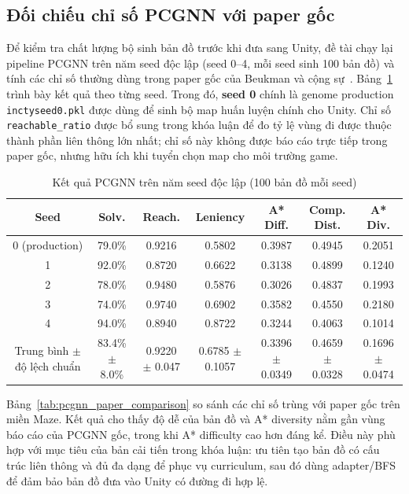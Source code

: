 \subsection{Đối chiếu chỉ số PCGNN với paper gốc}

Để kiểm tra chất lượng bộ sinh bản đồ trước khi đưa sang Unity, đề tài chạy lại pipeline PCGNN trên năm seed độc lập (seed 0--4, mỗi seed sinh 100 bản đồ) và tính các chỉ số thường dùng trong paper gốc của Beukman và cộng sự~\cite{Beukman2022}. Bảng~\ref{tab:pcgnn_four_seed_metrics} trình bày kết quả theo từng seed. Trong đó, \textbf{seed 0} chính là genome production \texttt{inctyseed0.pkl} được dùng để sinh bộ map huấn luyện chính cho Unity. Chỉ số \texttt{reachable\_ratio} được bổ sung trong khóa luận để đo tỷ lệ vùng đi được thuộc thành phần liên thông lớn nhất; chỉ số này không được báo cáo trực tiếp trong paper gốc, nhưng hữu ích khi tuyển chọn map cho môi trường game.

\begin{table}[H]
    \centering
    \scriptsize
    \setlength{\tabcolsep}{4pt}
    \renewcommand{\arraystretch}{1.15}
    \caption{Kết quả PCGNN trên năm seed độc lập (100 bản đồ mỗi seed)}
    \label{tab:pcgnn_four_seed_metrics}
    \begin{tabular}{c c c c c c c}
        \toprule
        \textbf{Seed} & \textbf{Solv.} & \textbf{Reach.} & \textbf{Leniency} & \textbf{A* Diff.} & \textbf{Comp. Dist.} & \textbf{A* Div.} \\
        \midrule
        0 (production) & 79.0\% & 0.9216 & 0.5802 & 0.3987 & 0.4945 & 0.2051 \\
        1 & 92.0\% & 0.8720 & 0.6622 & 0.3138 & 0.4899 & 0.1240 \\
        2 & 78.0\% & 0.9480 & 0.5876 & 0.3026 & 0.4837 & 0.1993 \\
        3 & 74.0\% & 0.9740 & 0.6902 & 0.3582 & 0.4550 & 0.2180 \\
        4 & 94.0\% & 0.8940 & 0.8722 & 0.3244 & 0.4063 & 0.1014 \\
        \midrule
        Trung bình $\pm$ độ lệch chuẩn & 83.4\% $\pm$ 8.0\% & 0.9220 $\pm$ 0.047 & 0.6785 $\pm$ 0.1057 & 0.3396 $\pm$ 0.0349 & 0.4659 $\pm$ 0.0328 & 0.1696 $\pm$ 0.0474 \\
        \bottomrule
    \end{tabular}
\end{table}

Bảng~\ref{tab:pcgnn_paper_comparison} so sánh các chỉ số trùng với paper gốc trên miền Maze. Kết quả cho thấy độ dễ của bản đồ và A* diversity nằm gần vùng báo cáo của PCGNN gốc, trong khi A* difficulty cao hơn đáng kể. Điều này phù hợp với mục tiêu của bản cải tiến trong khóa luận: ưu tiên tạo bản đồ có cấu trúc liên thông và đủ đa dạng để phục vụ curriculum, sau đó dùng adapter/BFS để đảm bảo bản đồ đưa vào Unity có đường đi hợp lệ.

